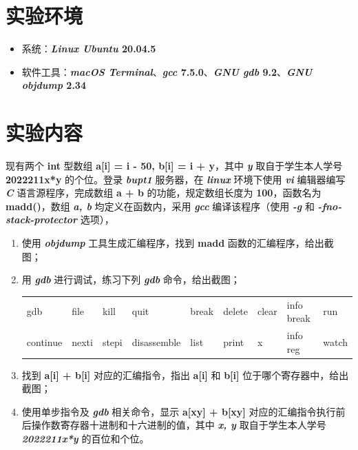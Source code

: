 \documentclass[UTF8, 12pt, a4paper, oneside]{ctexart}
\begin{document}
    \section{实验环境}
        \begin{itemize}
            \item 系统：\textbf{\textit{Linux Ubuntu} 20.04.5} 
            \item 软件工具：\textbf{\textit{macOS Terminal}}、\textbf{\textit{gcc} 7.5.0}、\textbf{\textit{GNU gdb} 9.2}、\textbf{\textit{GNU objdump} 2.34}
        \end{itemize}
    \section{实验内容}
        \par 现有两个 \textbf{int} 型数组 \textbf{a[i] = i - 50, b[i] = i + y}，其中 \textbf{\textit{y}} 取自于学生本人学号 \textbf{2022211x*y} 的个位。登录 \textbf{\textit{bupt1}} 服务器，在 \textbf{\textit{linux}} 环境下使用 \textbf{\textit{vi}} 编辑器编写 \textbf{\textit{C}} 语言源程序，完成数组 \textbf{a + b} 的功能，规定数组长度为 \textbf{100}，函数名为 \textbf{madd()}，数组 \textbf{\textit{a, b}} 均定义在函数内，采用 \textbf{\textit{gcc}} 编译该程序（使用 \textbf{\textit{-g}} 和 \textbf{\textit{-fno-stack-protector}} 选项），   
        \begin{enumerate}
            \item 使用 \textbf{\textit{objdump}} 工具生成汇编程序，找到 \textbf{madd} 函数的汇编程序，给出截图；
            \item 用 \textbf{\textit{gdb}} 进行调试，练习下列 \textbf{\textit{gdb}} 命令，给出截图；
                \begin{table}[htbp]
                    \begin{tabular}{lllllllll}
                        gdb & file & kill & quit & break & delete & clear & info break & run \\
                        continue & nexti & stepi & disassemble & list & print & x & info reg & watch \\
                    \end{tabular}
                \end{table}
            \item 找到 \textbf{a[i] + b[i]} 对应的汇编指令，指出 \textbf{a[i]} 和 \textbf{b[i]} 位于哪个寄存器中，给出截图；
            \item 使用单步指令及 \textbf{\textit{gdb}} 相关命令，显示 \textbf{a[xy] + b[xy]} 对应的汇编指令执行前后操作数寄存器十进制和十六进制的值，其中 \textbf{\textit{x, y}} 取自于学生本人学号 \textbf{\textit{2022211x*y}} 的百位和个位。
        \end{enumerate}
\end{document}
